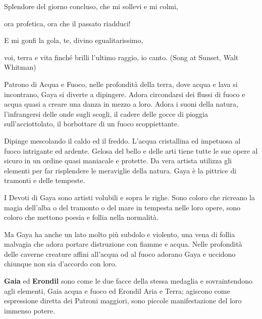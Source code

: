 \begin{multicols}{2}
\begin{enfasi}{
{Splendore del giorno concluso, che mi sollevi e mi colmi,

ora profetica, ora che il passato riadduci!

E mi gonfi la gola, te, divino egualitarissimo,

voi, terra e vita finché brilli l'ultimo raggio, io canto. (Song at Sunset, Walt Whitman)}
}\end{enfasi}

Patrono di Acqua e Fuoco, nelle profondità della terra, dove acqua e lava si incontrano, Gaya si diverte a dipingere. Adora circondarsi dei flussi di fuoco e acqua quasi a creare una danza in mezzo a loro. Adora i suoni della natura, l'infrangersi delle onde sugli scogli, il cadere delle gocce di pioggia sull'acciottolato, il borbottare di un fuoco scoppiettante.

Dipinge mescolando il caldo ed il freddo. L'acqua cristallina ed impetuosa al fuoco intrigante ed ardente. Gelosa del bello e delle arti tiene tutte le sue opere al sicuro in un ordine quasi maniacale e protette. Da vera artista utilizza gli elementi per far risplendere le meraviglie della natura. Gaya è la pittrice di tramonti e delle tempeste.

I Devoti di Gaya sono artisti volubili e sopra le righe. Sono coloro che ricreano la magia dell'alba o del tramonto o del mare in tempesta nelle loro opere, sono coloro che mettono poesia e follia nella normalità.

Ma Gaya ha anche un lato molto più subdolo e violento, una vena di follia malvagia che adora portare distruzione con fiamme e acqua. Nelle profondità delle caverne creature affini all'acqua od al fuoco adorano Gaya e uccidono chiunque non sia d'accordo con loro.

\begin{narratore}
\textbf{Gaia} ed \textbf{Erondil} sono come le due facce della stessa medaglia e sovraintendono agli elementi, Gaia acqua e fuoco ed Erondil Aria e Terra; agiscono come espressione diretta dei Patroni maggiori, sono piccole manifestazione del loro immenso potere.
\end{narratore}


\end{multicols}
